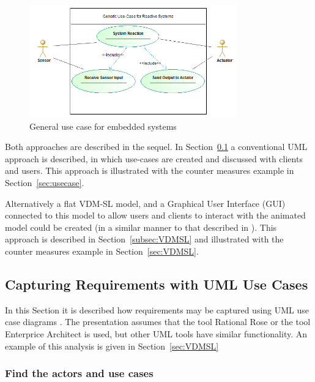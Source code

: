 \documentclass{overturerepchap}
\begin{document}
\begin{figure}
\begin{center}
\includegraphics[width=0.8\textwidth]{figures/generalusecase.png}
\end{center}
\caption{General use case for embedded systems}\label{fig:usecase}
\end{figure}

Both approaches are described in the sequel. In
Section~\ref{subsec:capuse} a conventional UML \cite{UML20} approach
is described, in which use-cases are created and discussed with
clients and users. This approach is illustrated with the counter
measures example in Section~\ref{sec:usecase}.

Alternatively a flat VDM-SL model, and a Graphical User Interface
(GUI) connected to this model to allow users and clients to interact
with the animated model could be created (in a similar manner to that
described in \cite{CashPoint}). This approach is described in
Section~\ref{subsec:VDMSL} and illustrated with the counter measures
example in Section~\ref{sec:VDMSL}.

\subsection{Capturing Requirements with UML Use Cases}\label{subsec:capuse}

In this Section it is described how requirements may be captured using
UML use case diagrams \cite{UML20}. The presentation assumes that the
tool Rational Rose \cite{Rose&00} or the tool Enterprice Architect 
is used, but other UML tools have
similar functionality. An example of this analysis is given in
Section~\ref{sec:VDMSL}

\subsubsection{Find the actors and use cases}
\end{document}
